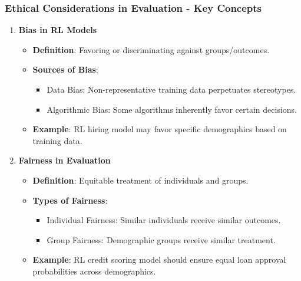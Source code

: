 \documentclass{beamer}
\begin{document}
\begin{frame}[fragile]
    \frametitle{Ethical Considerations in Evaluation - Key Concepts}
    \begin{enumerate}
        \item \textbf{Bias in RL Models}
        \begin{itemize}
            \item \textbf{Definition}: Favoring or discriminating against groups/outcomes.
            \item \textbf{Sources of Bias}:
            \begin{itemize}
                \item Data Bias: Non-representative training data perpetuates stereotypes.
                \item Algorithmic Bias: Some algorithms inherently favor certain decisions.
            \end{itemize}
            \item \textbf{Example}: RL hiring model may favor specific demographics based on training data.
        \end{itemize}
        
        \item \textbf{Fairness in Evaluation}
        \begin{itemize}
            \item \textbf{Definition}: Equitable treatment of individuals and groups.
            \item \textbf{Types of Fairness}:
            \begin{itemize}
                \item Individual Fairness: Similar individuals receive similar outcomes.
                \item Group Fairness: Demographic groups receive similar treatment.
            \end{itemize}
            \item \textbf{Example}: RL credit scoring model should ensure equal loan approval probabilities across demographics.
        \end{itemize}
    \end{enumerate}
\end{frame}
\end{document}
